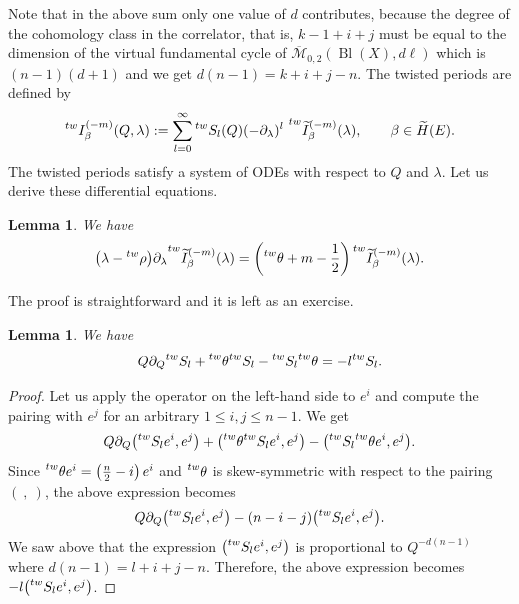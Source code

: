 \documentclass[pdftex]{sigma}
\numberwithin{equation}{section}
\newtheorem{Lemma}[Theorem]{Lemma}
\newcommand{\leftexp}[2]{{\vphantom{#2}}^{#1}{#2}}
\begin{document}
Note that in the above sum only one value of $d$ contributes, because the degree of the cohomology class in the correlator, that is, $k-1+i+j$ must be equal to the dimension of the virtual fundamental cycle of $\overline{\mathcal{M}}_{0,2}(\operatorname{Bl}(X),d\ell) $ which is $(n-1)(d+1)$ and we get $d(n-1) = k+i+j-n$.
 The twisted periods are defined by
 \[
 \leftexp{tw}{I}^{(-m)}_\beta(Q,\lambda) :=
 \sum_{l=0}^\infty
\leftexp{tw}{S}_l(Q) (-\partial_\lambda)^l\
 \leftexp{tw}{\widetilde{I}}^{(-m)}_\beta(\lambda),\qquad
 \beta\in \widetilde{H}(E).
 \]
The twisted periods satisfy a system of ODEs with respect to $Q$ and
$\lambda$. Let us derive these differential equations.
\begin{Lemma}\label{le:de-tw-calibr-period}
We have
\[
\big(\lambda-\leftexp{tw}{\rho}\big)\partial_\lambda
\leftexp{tw}{\widetilde{I}_\beta^{(-m)}}(\lambda)=
\left(
\leftexp{tw}{\theta}+m-\frac{1}{2}\right)
\leftexp{tw}{\widetilde{I}_\beta^{(-m)}}(\lambda).
\]
\end{Lemma}
The proof is straightforward and it is left as an exercise.
\begin{Lemma}\label{le:homog-tw-caibr}
We have
\[
Q\partial_Q \leftexp{tw}{S}_l +
\leftexp{tw}{\theta} \leftexp{tw}{S}_l -
\leftexp{tw}{S}_l \leftexp{tw}{\theta} = -l \leftexp{tw}{S}_l.
\]
\end{Lemma}
\begin{proof}
Let us apply the operator on the left-hand side to $e^i$ and compute the pairing
with $e^j$ for an arbitrary $1\leq i,j\leq n-1$. We get
\[
Q\partial_Q \big(\leftexp{tw}{S}_l e^i,e^j\big)+
\big(\leftexp{tw}{\theta} \leftexp{tw}{S}_l e^i,e^j\big)-
\big(\leftexp{tw}{S}_l \leftexp{tw}{\theta} e^i, e^j\big).
\]
Since $\leftexp{tw}{\theta} e^i= \left(\frac{n}{2}-i\right) e^i$ and
$\leftexp{tw}{\theta} $ is skew-symmetric with respect to the pairing
$(\ ,\ )$, the above expression becomes
\[
Q\partial_Q \big(\leftexp{tw}{S}_l e^i,e^j\big) -(n-i-j) \big(\leftexp{tw}{S}_l e^i,e^j\big).
\]
We saw above that the expression $\big(\leftexp{tw}{S}_l e^i,e^j\big)$ is
proportional to $Q^{-d(n-1)}$ where $d(n-1)=l+i+j-n$. Therefore, the
above expression becomes $-l \big(\leftexp{tw}{S}_l e^i,e^j\big)$.
\end{proof}
\end{document}
